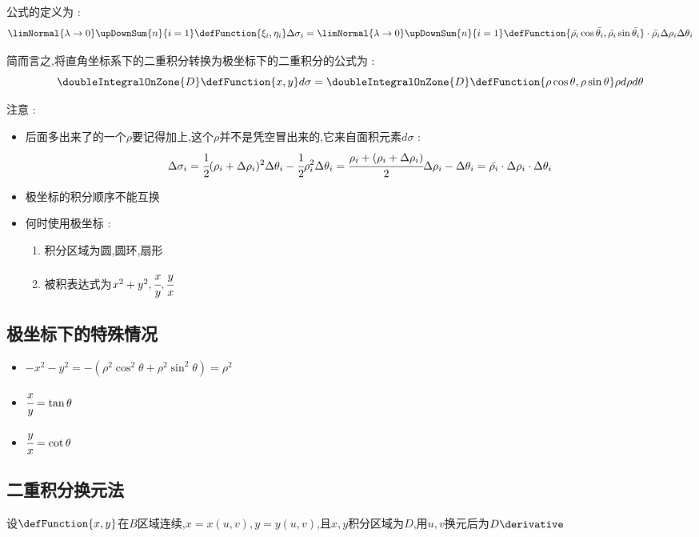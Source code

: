{{{    公式的定义为 :
    $$
      \limNormal{\lambda \to 0}\upDownSum{n}{i = 1}\defFunction{\xi_i,\eta_i}\Delta\sigma_i = \limNormal{\lambda \to 0}\upDownSum{n}{i = 1}\defFunction{\bar{\rho_i}\cos\bar{\theta_i}, \bar{\rho_i}\sin\bar{\theta_i}}\cdot\bar{\rho_i}\Delta\rho_i\Delta\theta_i
    $$

    简而言之,将直角坐标系下的二重积分转换为极坐标下的二重积分的公式为 :
    $$
      \doubleIntegralOnZone{D}\defFunction{x,y}d\sigma = \doubleIntegralOnZone{D}\defFunction{\rho\cos\theta,\rho\sin\theta}\rho d\rho d\theta
    $$

    注意 :
    \begin{itemize}
      \item {
            后面多出来了的一个$\rho$要记得加上,这个$\rho$并不是凭空冒出来的,它来自面积元素$d\sigma$ :
            $$
              \Delta\sigma_i = \cfrac{1}{2}(\rho_i + \Delta\rho_i)^2\Delta\theta_i - \cfrac{1}{2}\rho_i^2\Delta\theta_i = \cfrac{\rho_i + (\rho_i + \Delta\rho_i)}{2}\Delta\rho_i - \Delta\theta_i = \bar{\rho_i}\cdot\Delta\rho_i\cdot\Delta\theta_i
            $$
            }
      \item {
            极坐标的积分顺序不能互换
            }
      \item{
            何时使用极坐标 :
            \begin{enumerate}
              \item 积分区域为圆,圆环,扇形
              \item 被积表达式为$x^2 + y^2,\cfrac{x}{y},\cfrac{y}{x}$
            \end{enumerate}
            }
    \end{itemize}

  }%

  \subsection{极坐标下的特殊情况}{
    \begin{itemize}
      \item $-x^2 -y^2 = -(\rho^2\cos^2\theta + \rho^2\sin^2\theta) = \rho^2$
      \item $\cfrac{x}{y} = \tan\theta$
      \item $\cfrac{y}{x} = \cot\theta$
    \end{itemize}
  }%

  \subsection{二重积分换元法}{
    设$\defFunction{x,y}$在$B$区域连续,$x = x(u,v),y = y(u,v)$,且$x,y$积分区域为$D$,用$u,v$换元后为$D\derivative$\\

}}}

